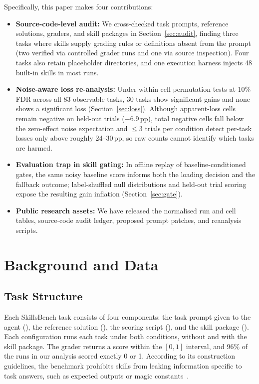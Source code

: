 \documentclass[10pt,conference]{IEEEtran}
\newif\ifkeepcuts \keepcutstrue
\newcommand{\cut}[1]{\ifkeepcuts #1\fi}
\begin{document}
Specifically, this paper makes four contributions:
\begin{itemize}
\item \textbf{Source-code-level audit:} We cross-checked task prompts, reference solutions, graders, and skill packages in Section~\ref{sec:audit}, finding three tasks where skills supply grading rules or definitions absent from the prompt (two verified via controlled grader runs and one via source inspection).\cut{ Four tasks also retain placeholder directories, and one execution harness injects 48 built-in skills in most runs.}
\item \textbf{Noise-aware loss re-analysis:} Under within-cell permutation tests at 10\% FDR across all 83 observable tasks, 30 tasks show significant gains and none shows a significant loss (Section~\ref{sec:loss}). Although apparent-loss cells remain negative on held-out trials ($-6.9$\,pp), total negative cells fall below the zero-effect noise expectation and $\le 3$ trials per condition detect per-task losses only above roughly 24--30\,pp, so raw counts cannot identify which tasks are harmed.
\item \textbf{Evaluation trap in skill gating:} In offline replay of baseline-conditioned gates, the same noisy baseline score informs both the loading decision and the fallback outcome; label-shuffled null distributions and held-out trial scoring expose the resulting gain inflation (Section~\ref{sec:gate}).
\item \textbf{Public research assets:} We have released the normalised run and cell tables, source-code audit ledger, proposed prompt patches, and reanalysis scripts.
\end{itemize}

\section{Background and Data}
\label{sec:data}
\subsection{Task Structure}
\leavevmode{} Each SkillsBench task consists of four components: the task prompt given to the agent (), the reference solution (), the scoring script (), and the skill package (). Each configuration runs each task under both conditions, without and with the skill package. The grader returns a score within the $[0,1]$ interval, and 96\% of the runs in our analysis scored exactly 0 or 1. According to its construction guidelines, the benchmark prohibits skills from leaking information specific to task answers, such as expected outputs or magic constants~\cite{li2026skillsbench}.
\end{document}
